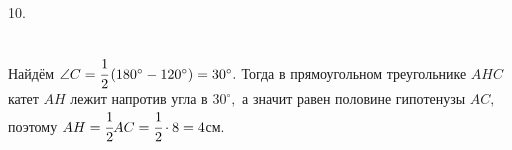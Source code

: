 10. \begin{figure}[ht!]
\end{figure}\\
Найдём $\angle C=\cfrac{1}{2}\left(180^\circ-120^\circ\right)=30^\circ.$ Тогда в прямоугольном треугольнике $AHC$ катет $AH$ лежит напротив угла в $30^\circ,$ а значит равен половине гипотенузы $AC,$ поэтому $AH=\cfrac{1}{2}AC=\cfrac{1}{2}\cdot8=4$см.\\
